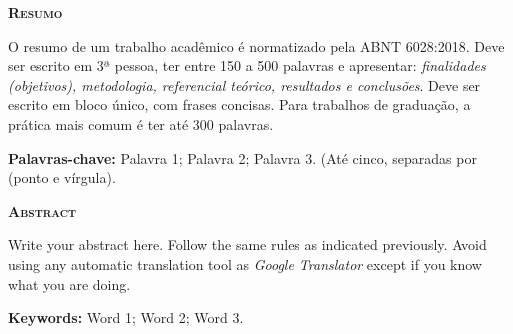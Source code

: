 {%
\newpage
\pagestyle{empty}
\begin{center}
    \textbf{\textsc{Resumo}}
\end{center}
\SingleSpacing\noindent
    O resumo de um trabalho acadêmico é normatizado pela ABNT 6028:2018. Deve ser escrito em 3ª pessoa, ter entre 150 a 500 palavras e apresentar: \textit{finalidades (objetivos), metodologia, referencial teórico, resultados e conclusões}. Deve ser escrito em bloco único, com frases concisas. Para trabalhos de graduação, a prática mais comum é ter até 300 palavras.

\vspace*{0.5cm}
\noindent\textbf{Palavras-chave:} Palavra 1; Palavra 2; Palavra 3. (Até cinco, separadas por \q{ ; } (ponto e vírgula).

\newpage
\pagestyle{empty}
\begin{center}
    \textbf{\textsc{Abstract}}
\end{center}
\SingleSpacing\noindent
    Write your abstract here. Follow the same rules as indicated previously. Avoid using any automatic translation tool as \textit{Google Translator} except if you know what you are doing.

\vspace*{0.5cm}
\noindent\textbf{Keywords:} Word 1; Word 2; Word 3.
}
\newpage\listoffigures*
\thispagestyle{empty}
\newpage\listoftables*
\thispagestyle{empty}
\printglossary[
    type=\acronymtype,
    title={Lista de abreviaturas e siglas}
]
\thispagestyle{empty}
\newpage\tableofcontents*
\thispagestyle{empty}
